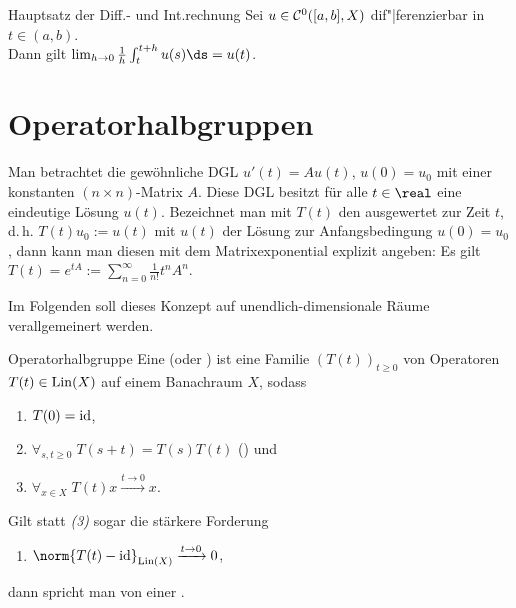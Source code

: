\begin{Satz}{Hauptsatz der Diff.- und Int.rechnung}
    Sei $u \in \mathcal{C}^0([a, b], X)$ dif"|ferenzierbar in $t \in (a, b)$.\\
    Dann gilt $\lim_{h \to 0} \frac{1}{h} \int_t^{t+h} u(s)\ds = u(t)$.
\end{Satz}

\section{%
    Operatorhalbgruppen%
}

\begin{Bem}
    Man betrachtet die gewöhnliche DGL $u'(t) = Au(t)$, $u(0) = u_0$
    mit einer konstanten $(n \times n)$-Matrix $A$.
    Diese DGL besitzt für alle $t \in \real$ eine eindeutige Lösung $u(t)$.
    Bezeichnet man mit $T(t)$ den  ausgewertet zur Zeit $t$,
    d.\,h. $T(t)u_0 := u(t)$ mit $u(t)$ der Lösung zur Anfangsbedingung $u(0) = u_0$,
    dann kann man diesen mit dem Matrixexponential explizit angeben:
    Es gilt $T(t) = e^{tA} := \sum_{n=0}^\infty \frac{1}{n!} t^n A^n$.

    Im Folgenden soll dieses Konzept auf unendlich-dimensionale Räume verallgemeinert werden.
\end{Bem}

\linie

\begin{Def}{Operatorhalbgruppe}
    Eine  (oder ) ist eine
    Familie $(T(t))_{t \ge 0}$ von Operatoren $T(t) \in \operatorname{Lin}(X)$ auf einem Banachraum $X$, sodass
    \begin{enumerate}
        \item
        $T(0) = \text{id}$,

        \item
        $\forall_{s, t \ge 0}\; T(s+t) = T(s) T(t)$
        () und

        \item
        $\forall_{x \in X}\; T(t) x \xrightarrow{t \to 0} x$.
    \end{enumerate}
    Gilt statt \emph{(3)} sogar die stärkere Forderung
    \begin{enumerate}[label=\emph{(\arabic*')},start=3]
        \item
        $\norm{T(t) - \id}_{\Lin(X)} \xrightarrow{t \to 0} 0$,
    \end{enumerate}
    dann spricht man von einer .
\end{Def}

